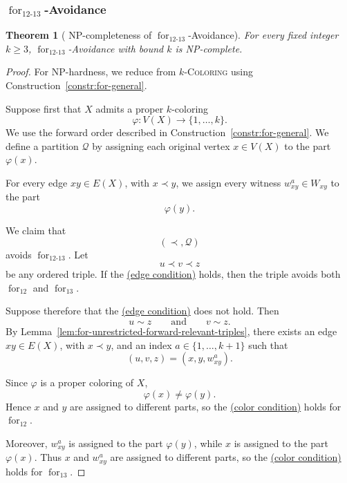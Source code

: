 \documentclass[12pt]{article}
\theoremstyle{plain}
\newtheorem{theorem}{Theorem}[section]
\theoremstyle{definition}
\theoremstyle{remark}
\theoremstyle{definition}
\newcommand{\edgecondition}{%
  \hyperref[def:avoid:cond:edge]{(edge condition)}\xspace
}
\newcommand{\colorcondition}{%
  \hyperref[def:avoid:cond:color]{(color condition)}\xspace
}
\newcommand{\forlabel}{\mathrm{for}}
\DeclareRobustCommand{\forparam}[1]{%
  \ensuremath{\mathop{\forlabel}\nolimits_{#1}}%
}
\begin{document}
\subsubsection{
\texorpdfstring{\(\forparam{12\text{-}13}\)-Avoidance}
{for12-13-Avoidance}
}
\label{subsubsec:for12-13-avoidance}






\begin{theorem}[
NP-completeness of
\texorpdfstring{\(\forparam{12\text{-}13}\)-Avoidance}
{for12-13-Avoidance}
]
\label{thm:for12-13-np-complete}
For every fixed integer \(k\ge 3\),
\(\forparam{12\text{-}13}\)-Avoidance with bound \(k\) is NP-complete.
\end{theorem}

\begin{proof}
For NP-hardness, we reduce from \(k\)-\textsc{Coloring} using
Construction~\ref{constr:for-general}.

Suppose first that \(X\) admits a proper \(k\)-coloring
\[
\varphi:V(X)\to\{1,\dots,k\}.
\]
We use the forward order described in
Construction~\ref{constr:for-general}. We define a partition
\(\mathcal Q\) by assigning each original vertex \(x\in V(X)\) to the
part \(\varphi(x)\).

For every edge \(xy\in E(X)\), with \(x\prec y\), we assign every
witness \(w^a_{xy}\in W_{xy}\) to the part
\[
\varphi(y).
\]

We claim that
\[
(\prec,\mathcal Q)
\]
avoids \(\forparam{12\text{-}13}\). Let
\[
u\prec v\prec z
\]
be any ordered triple. If the \edgecondition{} holds, then the triple
avoids both \(\forparam{12}\) and \(\forparam{13}\).

Suppose therefore that the \edgecondition{} does not hold. Then
\[
u\sim z
\qquad\text{and}\qquad
v\sim z.
\]
By Lemma~\ref{lem:for-unrestricted-forward-relevant-triples}, there
exists an edge \(xy\in E(X)\), with \(x\prec y\), and an index
\(a\in\{1,\dots,k+1\}\) such that
\[
(u,v,z)=(x,y,w^a_{xy}).
\]

Since \(\varphi\) is a proper coloring of \(X\),
\[
\varphi(x)\neq\varphi(y).
\]
Hence \(x\) and \(y\) are assigned to different parts, so the
\colorcondition{} holds for \(\forparam{12}\).

Moreover, \(w^a_{xy}\) is assigned to the part \(\varphi(y)\), while
\(x\) is assigned to the part \(\varphi(x)\). Thus \(x\) and
\(w^a_{xy}\) are assigned to different parts, so the
\colorcondition{} holds for \(\forparam{13}\).


\end{proof}
\end{document}
